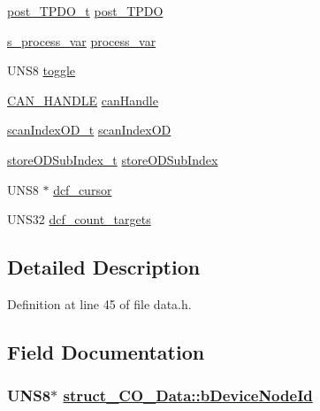 \begin{CompactItemize}
\item 
\hyperlink{sync_8h_b9bc4632750ad12f918aa22a1eb7756b}{post\_\-TPDO\_\-t} \hyperlink{structstruct__CO__Data_0cf540e2e36e14c04e1c783dc88d9a0e}{post\_\-TPDO}
\item 
\hyperlink{structstruct__s__process__var}{s\_\-process\_\-var} \hyperlink{structstruct__CO__Data_26f4d508a9e409f2ace9c8c55d92d826}{process\_\-var}
\item 
UNS8 \hyperlink{structstruct__CO__Data_01f012ef56b614a9519530433b01054f}{toggle}
\item 
\hyperlink{win32_2applicfg_8h_712c7b28987b12b8d400df19c92d0f5e}{CAN\_\-HANDLE} \hyperlink{structstruct__CO__Data_c960c3c56e8389105c2853cfb393de0c}{can\-Handle}
\item 
\hyperlink{objdictdef_8h_a844575e4d9c9870137121bf0fb241fb}{scan\-Index\-OD\_\-t} \hyperlink{structstruct__CO__Data_1863bd74fef91ec89b4c1ff0bee2dfbf}{scan\-Index\-OD}
\item 
\hyperlink{objacces_8h_7b55b55a3f5ed8e4b2991cb85c7be7ce}{store\-ODSub\-Index\_\-t} \hyperlink{structstruct__CO__Data_d6cd6ffa658b1ed35d887b6bacb990cf}{store\-ODSub\-Index}
\item 
UNS8 $\ast$ \hyperlink{structstruct__CO__Data_de0a65bcf0cb16fd4dafe4d866655aab}{dcf\_\-cursor}
\item 
UNS32 \hyperlink{structstruct__CO__Data_0a588710c53092b75cfe284ca7d9ccff}{dcf\_\-count\_\-targets}
\end{CompactItemize}


\subsection{Detailed Description}




Definition at line 45 of file data.h.

\subsection{Field Documentation}
\hypertarget{structstruct__CO__Data_e5c35e97a1061bb9737359cc12192269}{
\subsubsection[bDeviceNodeId]{\setlength{\rightskip}{0pt plus 5cm}UNS8$\ast$ \hyperlink{structstruct__CO__Data_e5c35e97a1061bb9737359cc12192269}{struct\_\-CO\_\-Data::b\-Device\-Node\-Id}}}
\label{structstruct__CO__Data_e5c35e97a1061bb9737359cc12192269}





